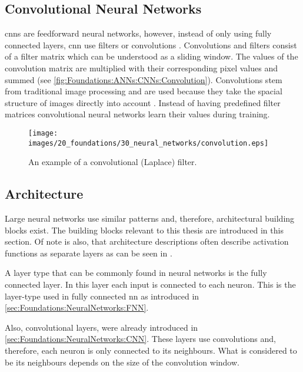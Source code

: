 \subsection{Convolutional Neural Networks}
\label{sec:Foundations:NeuralNetworks:CNN}

\Acp{cnn} are feedforward neural networks, however, instead of only using fully connected layers, \ac{cnn} use filters or convolutions \cite{teuwen2020convolutional}. Convolutions and filters consist of a filter matrix which can be understood as a sliding window. The values of the convolution matrix are multiplied with their corresponding pixel values and summed (see \autoref{fig:Foundations:ANNs:CNNs:Convolution}). Convolutions stem from traditional image processing \cite{shih2010image} and are used because they take the spacial structure of images directly into account \cite{nielsen2015neural}. Instead of having predefined filter matrices convolutional neural networks learn their values during training.

\begin{figure}
    \centering
    \texttt{[image: images/20\_foundations/30\_neural\_networks/convolution.eps]}
    \caption{An example of a convolutional (Laplace) filter.}
    \label{fig:Foundations:ANNs:CNNs:Convolution}
\end{figure}


\subsection{Architecture}
\label{sec:Foundations:NeuralNetworks:Architecture}

Large neural networks use similar patterns and, therefore, architectural building blocks exist. The building blocks relevant to this thesis are introduced in this section.
Of note is also, that architecture descriptions often describe activation functions as separate layers as can be seen in .

A layer type that can be commonly found in neural networks is the fully connected layer. In this layer each input is connected to each neuron. This is the layer-type used in fully connected \ac{nn} as introduced in \autoref{sec:Foundations:NeuralNetworks:FNN}.

Also, convolutional layers, were already introduced in \autoref{sec:Foundations:NeuralNetworks:CNN}. These layers use convolutions and, therefore, each neuron is only connected to its neighbours. What is considered to be its neighbours depends on the size of the convolution window.

